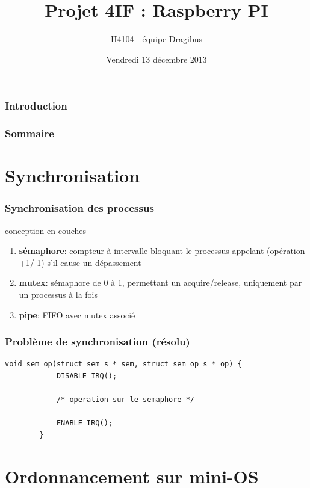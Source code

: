 \documentclass{beamer}
\title[Presentation SEA]{Projet 4IF : Raspberry PI}
\author{H4104 - équipe Dragibus}
\institute{INSA de Lyon}
\date{Vendredi 13 décembre 2013}
\begin{document}
\begin{frame}
    \titlepage
\end{frame}

\begin{frame}
    \frametitle{Introduction}

\end{frame}

\begin{frame}
    \frametitle{Sommaire}
    \tableofcontents
\end{frame}

\section{Synchronisation}

\begin{frame}
    \frametitle{Synchronisation des processus}

    \begin{center}
        \huge conception en couches
    \end{center}

    \begin{enumerate}
        \item<2-> \textbf{sémaphore}: compteur à intervalle bloquant le
            processus appelant (opération +1/-1) s'il cause un dépassement
        \item<3-> \textbf{mutex}: sémaphore de 0 à 1, permettant un
            acquire/release, uniquement par un processus à la fois
        \item<4-> \textbf{pipe}: FIFO avec mutex associé
    \end{enumerate}
\end{frame}

\begin{frame}[fragile]
    \frametitle{Problème de synchronisation (résolu)}

    \begin{lstlisting}[caption=Opération atomique sur un sémaphore]
        void sem_op(struct sem_s * sem, struct sem_op_s * op) {
            DISABLE_IRQ();

            /* operation sur le semaphore */

            ENABLE_IRQ();
        }
    \end{lstlisting}
\end{frame}

\section{Ordonnancement sur mini-OS}
\end{document}
